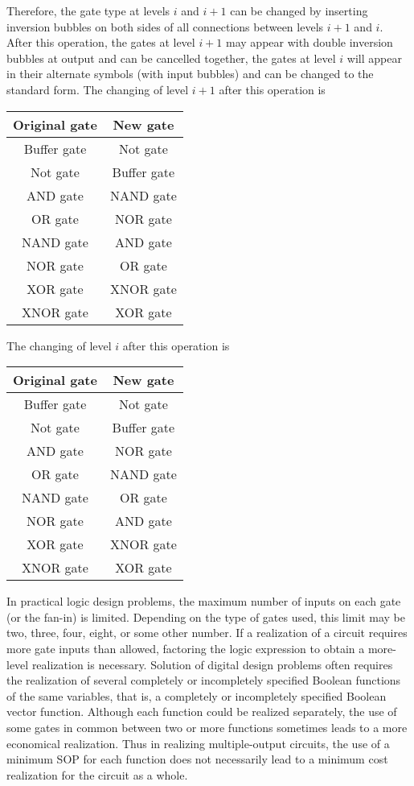 \documentclass[a4paper,12pt]{article}
\begin{document}
\begin{itemize}
\begin{itemize}
\begin{itemize}
\begin{itemize}
\begin{itemize}
\begin{itemize}
\begin{itemize}
Therefore, the gate type at levels $i$ and $i+1$ can be changed by inserting inversion bubbles on both sides of all connections between levels $i+1$ and $i$. After this operation, the gates at level $i+1$ may appear with double inversion bubbles at output and can be cancelled together, the gates at level $i$ will appear in their alternate symbols (with input bubbles) and can be changed to the standard form. The changing of level $i+1$ after this operation is
\begin{longtable}[c]{|c|c|}
\hline
Original gate & New gate \\\hline\endhead
Buffer gate & Not gate \\\hline
Not gate & Buffer gate \\\hline
AND gate & NAND gate \\\hline
OR gate & NOR gate \\\hline
NAND gate & AND gate \\\hline
NOR gate & OR gate \\\hline
XOR gate & XNOR gate \\\hline
XNOR gate & XOR gate \\\hline
\end{longtable}
The changing of level $i$ after this operation is
\begin{longtable}[c]{|c|c|}
\hline
Original gate & New gate \\\hline\endhead
Buffer gate & Not gate \\\hline
Not gate & Buffer gate \\\hline
AND gate & NOR gate \\\hline
OR gate & NAND gate \\\hline
NAND gate & OR gate \\\hline
NOR gate & AND gate \\\hline
XOR gate & XNOR gate \\\hline
XNOR gate & XOR gate \\\hline
\end{longtable}
In practical logic design problems, the maximum number of inputs on each gate (or the fan-in) is limited. Depending on the type of gates used, this limit may be two, three, four, eight, or some other number. If a realization of a circuit requires more gate inputs than allowed, factoring the logic expression to obtain a more-level realization is necessary.
Solution of digital design problems often requires the realization of several completely or incompletely specified Boolean functions of the same variables, that is, a completely or incompletely specified Boolean vector function. Although each function could be realized separately, the use of some gates in common between two or more functions sometimes leads to a more economical realization. Thus in realizing multiple-output circuits, the use of a minimum SOP for each function does not necessarily lead to a minimum cost realization for the circuit as a whole.


\end{itemize}
\end{itemize}
\end{itemize}
\end{itemize}
\end{itemize}
\end{itemize}
\end{itemize}
\end{document}
